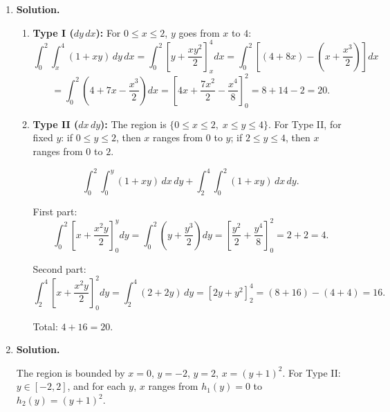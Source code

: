 \begin{enumerate}
Total area $= 27/2 + 17/6 = 81/6+17/6 = \boxed{\dfrac{98}{6} = \dfrac{49}{3}}$.

\item \textbf{Solution.}
\begin{enumerate}
\item \textbf{Type I ($dy\,dx$):} For $0\le x\le 2$, $y$ goes from $x$ to $4$:
\[
\int_0^2\int_x^4(1+xy)\,dy\,dx = \int_0^2\left[y+\frac{xy^2}{2}\right]_x^4 dx = \int_0^2\left[(4+8x)-\left(x+\frac{x^3}{2}\right)\right]dx
\]
\[
= \int_0^2\left(4+7x-\frac{x^3}{2}\right)dx = \left[4x+\frac{7x^2}{2}-\frac{x^4}{8}\right]_0^2 = 8+14-2 = \boxed{20}.
\]

\item \textbf{Type II ($dx\,dy$):} The region is $\{0\le x\le 2,\; x\le y\le 4\}$. For Type II, for fixed $y$: if $0\le y\le 2$, then $x$ ranges from $0$ to $y$; if $2\le y\le 4$, then $x$ ranges from $0$ to $2$.

\[
\int_0^2\int_0^y(1+xy)\,dx\,dy + \int_2^4\int_0^2(1+xy)\,dx\,dy.
\]

First part:
\[
\int_0^2\left[x+\frac{x^2 y}{2}\right]_0^y dy = \int_0^2\left(y+\frac{y^3}{2}\right)dy = \left[\frac{y^2}{2}+\frac{y^4}{8}\right]_0^2 = 2+2=4.
\]

Second part:
\[
\int_2^4\left[x+\frac{x^2 y}{2}\right]_0^2 dy = \int_2^4(2+2y)\,dy = \left[2y+y^2\right]_2^4 = (8+16)-(4+4)=16.
\]

Total: $4+16 = 20$.
\end{enumerate}

\item \textbf{Solution.}
\begin{center}
\end{center}
The region is bounded by $x=0$, $y=-2$, $y=2$, $x=(y+1)^2$. For Type II: $y\in[-2,2]$, and for each $y$, $x$ ranges from $h_1(y)=0$ to $h_2(y)=(y+1)^2$.


\end{enumerate}
